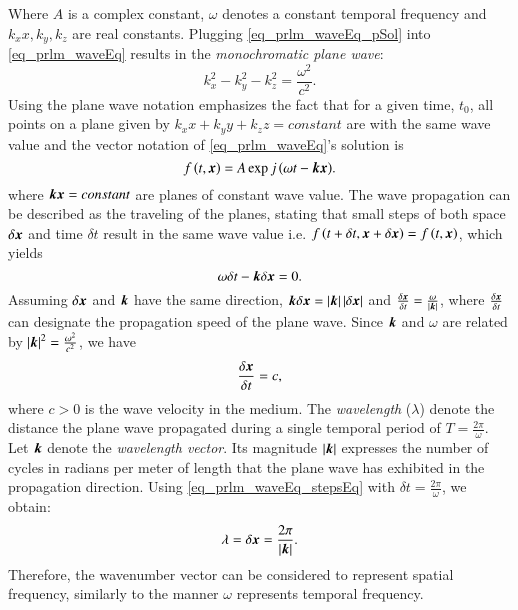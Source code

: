 Where $A$ is a complex constant, $\omega$ denotes a constant temporal frequency and $k_{x}x,k_{y},k_{z}$ are real constants. 
Plugging \eqref{eq_prlm_waveEq_pSol} into \eqref{eq_prlm_waveEq} results in the \emph{monochromatic plane wave}:
\begin{equation}
\label{eq_prlm_waveEq_subs}
k_{x}^{2}-k_{y}^{2}-k_{z}^{2} = \frac{\omega^{2}}{c^{2}}.
\end{equation}
Using the plane wave notation emphasizes the fact that for a given time, $t_{0}$, all points on a plane given by $k_{x}x+k_{y}y+k_{z}z = constant$ are with the same wave value and the vector notation of \eqref{eq_prlm_waveEq}'s solution is
\begin{equation}
\label{eq_prlm_waveEq_finSol}
f\left({t,\boldsymbol{x}}\right)=A\exp{j\left({\omega{t}-\boldsymbol{k}\boldsymbol{x}}\right)}.
\end{equation}
where $\boldsymbol{k}\boldsymbol{x}=constant$ are planes of constant wave value.
The wave propagation can be described as the traveling of the planes, stating that small steps of both space $\delta{\boldsymbol{x}}$ and time $\delta{t}$ result in the same wave value i.e. $f\left({t+\delta{t},\boldsymbol{x}+\delta{\boldsymbol{x}}}\right) = f\left({t,\boldsymbol{x}}\right)$, which yields
\begin{equation}
\omega\delta{t}-\boldsymbol{k}\delta\boldsymbol{x}=0.
\end{equation}
Assuming $\delta\boldsymbol{x}$ and $\boldsymbol{k}$ have the same direction, $\boldsymbol{k}\delta\boldsymbol{x} = \left\vert\boldsymbol{k}\right\vert\left\vert\delta\boldsymbol{x}\right\vert$ and $\frac{\delta{\boldsymbol{x}}}{\delta{t}} = \frac{\omega}{\left\vert\boldsymbol{k}\right\vert}$, where $\frac{\delta{\boldsymbol{x}}}{\delta{t}}$ can designate the propagation speed of the plane wave. 
Since $\boldsymbol{k}$ and $\omega$ are related by $\left\vert\boldsymbol{k}\right\vert^{2}=\frac{\omega^{2}}{c^{2}}$, we have
\begin{equation}
\label{eq_prlm_waveEq_stepsEq}
\frac{\delta{\boldsymbol{x}}}{\delta{t}}=c,
\end{equation}
where $c>0$ is the wave velocity in the medium.
The \emph{wavelength} ($\lambda$) denote the distance the plane wave propagated during a single temporal period of $T=\frac{2\pi}{\omega}$.
Let $\boldsymbol{k}$ denote the \emph{wavelength vector}. 
Its magnitude $\left\vert\boldsymbol{k}\right\vert$ expresses the number of cycles in radians per meter of length that the plane wave has exhibited in the propagation direction.
Using \eqref{eq_prlm_waveEq_stepsEq} with $\delta{t} = \frac{2\pi}{\omega}$, we obtain:
\begin{equation}
\lambda=\delta{\boldsymbol{x}}=\frac{2\pi}{\left\vert\boldsymbol{k}\right\vert}.
\end{equation}
Therefore, the wavenumber vector can be considered to represent spatial frequency, similarly to the manner $\omega$ represents temporal frequency.